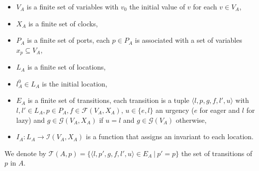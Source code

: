 \documentclass[a4paper]{article}
\begin{document}
\begin{itemize}
  \item $V_A$ is a finite set of variables with $v_0$ the initial value of $v$ for each $v \in V_A$,
  \item $X_A$ is a finite set of clocks,
  \item $P_A$ is a finite set of ports, each $p \in P_A$ is associated with a set of variables $x_p \subseteq V_A$,
  \item $L_A$ is a finite set of locations,
  \item $l_A^0 \in L_A$ is the initial location,
  \item $E_A$ is a finite set of transitions, each transition is a tuple $\langle l, p, g, f, l', u \rangle$ with
        $l,l' \in L_A, p \in P_A, f \in \mathcal{F}(V_A, X_A)$, $u \in \{e,l\}$ an urgency ($e$ for eager and $l$ for
        lazy) and $g \in \mathcal{G}(V_A, X_A)$ if $u = l$ and $g \in \mathcal{G}(V_A)$ otherwise,
  \item $I_A: L_A \to \mathcal{I}(V_A,X_A)$ is a function that assigns an invariant to each location.
\end{itemize}
We denote by $\mathcal{T}(A,p)=\{\langle l, p', g, f, l',u \rangle \in E_{A} \:\vert\: p'=p\}$ the set of transitions
of $p$ in $A$.
\end{document}
